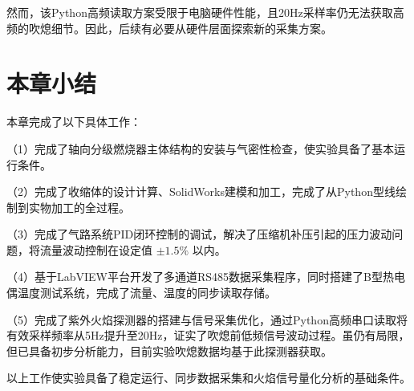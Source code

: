 然而，该Python高频读取方案受限于电脑硬件性能，且20Hz采样率仍无法获取高频的吹熄细节。因此，后续有必要从硬件层面探索新的采集方案。

\section{本章小结}

本章完成了以下具体工作：

（1）完成了轴向分级燃烧器主体结构的安装与气密性检查，使实验具备了基本运行条件。

（2）完成了收缩体的设计计算、SolidWorks建模和加工，完成了从Python型线绘制到实物加工的全过程。

（3）完成了气路系统PID闭环控制的调试，解决了压缩机补压引起的压力波动问题，将流量波动控制在设定值 \(\pm 1.5\%\) 以内。

（4）基于LabVIEW平台开发了多通道RS485数据采集程序，同时搭建了B型热电偶温度测试系统，完成了流量、温度的同步读取存储。

（5）完成了紫外火焰探测器的搭建与信号采集优化，通过Python高频串口读取将有效采样频率从5Hz提升至20Hz，证实了吹熄前低频信号波动过程。虽仍有局限，但已具备初步分析能力，目前实验吹熄数据均基于此探测器获取。

以上工作使实验具备了稳定运行、同步数据采集和火焰信号量化分析的基础条件。